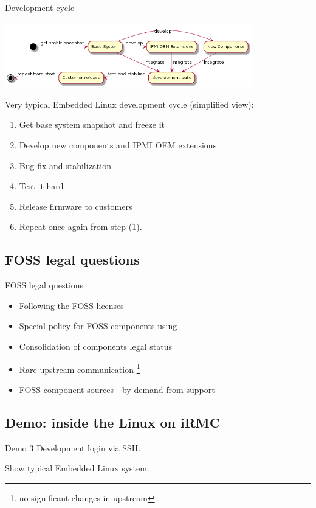 \documentclass{beamer}
\begin{document}
  \begin{frame}{Development cycle}

	  \begin{center}
		  \includegraphics[height=80pt]{diagrams/embedded-release-cycle.png}
	  \end{center}

	  Very typical Embedded Linux development cycle (simplified view):
	  \begin{enumerate}
		  \item Get base system snapshot and freeze it
		  \item Develop new components and IPMI OEM extensions
		  \item Bug fix and stabilization
		  \item Test it hard
		  \item Release firmware to customers
		  \item Repeat once again from step  (1).
	  \end{enumerate}
  \end{frame}

  \subsection{FOSS legal questions}
  \begin{frame}{FOSS legal questions}
	  \begin{itemize}
		  \item Following the FOSS licenses
		  \item Special policy for FOSS components using
		  \item Consolidation of components legal status
		  \item Rare upstream communication \footnote{no significant changes in upstream}
		  \item FOSS component sources - by demand from support
	  \end{itemize}
  \end{frame}

  \subsection{Demo: inside the Linux on iRMC}
  \begin{frame}{Demo 3}
	 Development login via SSH.

	 Show typical Embedded Linux system.
  \end{frame}
\end{document}
